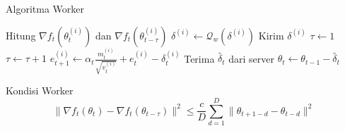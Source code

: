 \begin{frame}{Algoritma Worker}
  \begin{algorithm}[H]
    \begin{algorithmic}[1]
      \State Hitung $\nabla f_t(\theta^{(i)}_{t})$ dan $\nabla f_t(\theta^{(i)}_{t-\tau})$
      \State $\delta^{(i)} \gets \mathcal{Q}_w(\delta^{(i)})$
      \State Kirim $\delta^{(i)}$
      \State $\tau \gets 1$
      \Else
      \State $\tau \gets \tau + 1$
      \EndIf
      \State $e_{t+1}^{(i)} \gets \alpha_t \frac{m_t^{(i)}}{\sqrt{v_t^{(i)}}} + e_t^{(i)} - \delta_t^{(i)}$
      \State Terima $\tilde{\delta_t}$ dari server
      \State $\theta_{t} \gets \theta_{t-1} - \tilde{\delta_t}$
      \EndFor
    \end{algorithmic}
  \end{algorithm}
\end{frame}

\begin{frame}{Kondisi Worker}
  \begin{equation}
    \label{cada2cond}
    \|\nabla f_t(\theta_t) - \nabla f_t(\theta_{t-\tau})\|^2 \leq \frac{c}{D} \sum_{d=1}^{D} \|\theta_{t+1-d} - \theta_{t-d}\|^2
  \end{equation}
\end{frame}

